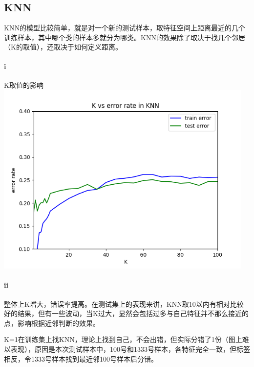 \documentclass[hyperref,UTF8]{ctexart}
\begin{document}
\subsection{KNN}
\par KNN的模型比较简单，就是对一个新的测试样本，取特征空间上距离最近的几个训练样本，其中哪个类的样本多就分为哪类。KNN的效果除了取决于找几个邻居（K的取值），还取决于如何定义距离。
\paragraph{i}K取值的影响\\
\includegraphics[height=3.8in]{KNN.png}\\
\paragraph{ii} 整体上K增大，错误率提高。在测试集上的表现来讲，KNN取10以内有相对比较好的结果，但有一些波动，当K过大，显然会包括过多与自己特征并不那么接近的点，影响根据近邻判断的效果。
\par K=1在训练集上找KNN，理论上找到自己，不会出错，但实际分错了1份（图上难以表现），原因是本次测试样本中，100号和1333号样本，各特征完全一致，但标签相反，令1333号样本找到最近邻100号样本后分错。
\end{document}
